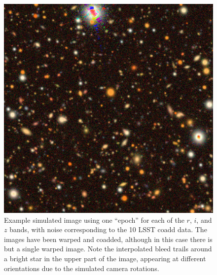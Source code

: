 \documentclass[twocolumn,twocolappendix,astrosym]{openjournal}
\begin{document}
\begin{figure}
    \includegraphics[width=\columnwidth]{example-image.jpg}
    \caption{
        Example simulated image using one ``epoch'' for each of the $r$, $i$,
        and $z$ bands, with noise corresponding to the 10 LSST coadd data.
        The images have been warped and coadded, although in this case there
        is but a single warped image.
        Note the interpolated bleed trails around a bright star in the upper
        part of the image, appearing at different orientations due to the
        simulated camera rotations.
    } \label{fig:colorimage}
\end{figure}
\end{document}
